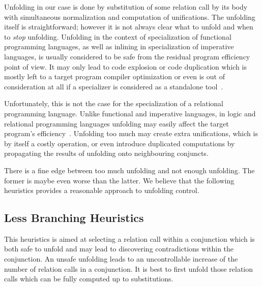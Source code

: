 Unfolding in our case is done by substitution of some relation call by its body with simultaneous normalization and computation of unifications.
The unfolding itself is straightforward; however it is not always clear what to unfold and when to \emph{stop} unfolding.
Unfolding in the context of specialization of functional programming languages, as well as inlining in specialization of imperative languages, is usually considered to be safe from the residual program efficiency point of view.
It may only lead to code explosion or code duplication which is mostly left to a target program compiler optimization or even is out of consideration at all if a specializer is considered as a standalone tool~\cite{jonesbook}.

Unfortunately, this is not the case for the specialization of a relational programming language.
Unlike functional and imperative languages, in logic and relational programming languages unfolding may easily affect the target program's efficiency~\cite{leuschel2002logic}.
Unfolding too much may create extra unifications, which is by itself a costly operation, or even introduce duplicated computations by propagating the results of unfolding onto neighbouring conjuncts.

There is a fine edge between too much unfolding and not enough unfolding.
The former is maybe even worse than the latter.
We believe that the following heuristics provides a reasonable approach to unfolding control.

\subsection{Less Branching Heuristics}
\label{sec:heurictic}

This heuristics is aimed at selecting a relation call within a conjunction which is both safe to unfold and may lead to discovering contradictions within the conjunction.
An unsafe unfolding leads to an uncontrollable increase of the number of relation calls in a conjunction.
It is best to first unfold those relation calls which can be fully computed up to substitutions.

